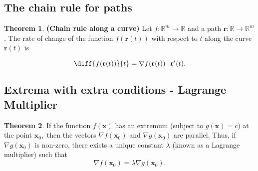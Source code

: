 \documentclass[12pt, a4paper]{article}
\newcommand{\bb}[1]{\mathbb{#1}}
\newcommand{\mb}[1]{\mathbf{#1}}
\theoremstyle{definition}
\newtheorem{theorem}{Theorem}[section]
\theoremstyle{plain}
\begin{document}
\subsection{The chain rule for paths}

\begin{theorem}
\textbf{(Chain rule along a curve)} Let $f:\bb{R}^m\to\bb{R}$ and a path $\mb{r}:\bb{R}\to \bb{R}^m$. The rate of change of the function $f(\mb{r}(t))$ with respect to $t$ along the curve $\mb{r}(t)$ is
\begin{tcolorbox}
$$\diff{f(\mb{r}(t))}{t}=\nabla f(\mb{r}(t))\cdot \mb{r'}(t).$$
\end{tcolorbox}
\end{theorem}

\subsection{Extrema with extra conditions - Lagrange Multiplier}

\begin{theorem}
If the function $f(\mb{x})$ has an extremum (subject to $g(\mb{x}) = c$) at the point $\mb{x}_0,$ then the vectors $\nabla f(\mb{x}_0)$ and $\nabla g(\mb{x}_0)$ are parallel. Thus, if $\nabla g(\mb{x}_0)$ is non-zero, there exists a unique constant $\lambda$ (known as a Lagrange multiplier) such that $$\nabla f(\mb{x}_0)=\lambda\nabla g(\mb{x}_0).$$
\end{theorem}
\end{document}
